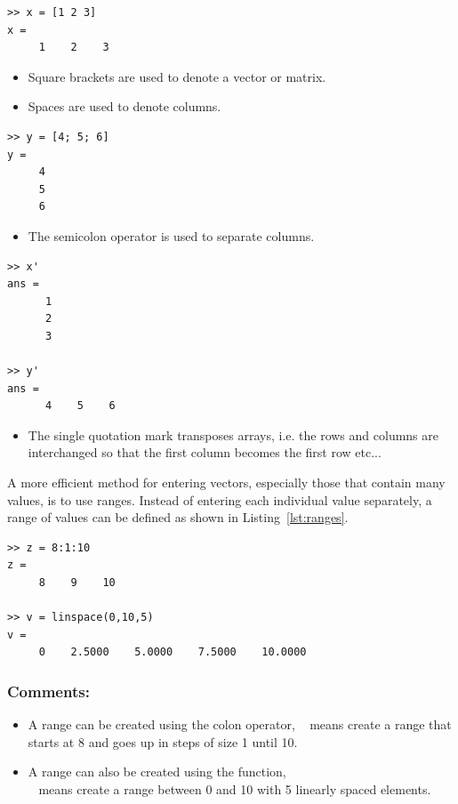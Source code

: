 \begin{lstlisting}[caption={Creating a row vector},label=lst:row_vect]
>> x = [1 2 3]
x = 
	 1    2    3
\end{lstlisting}
\begin{itemize}
\item Square brackets are used to denote a vector or matrix.
\item Spaces are used to denote columns.
\end{itemize}

\begin{lstlisting}[caption={Creating a column vector},label=lst:col_vect]	
>> y = [4; 5; 6]
y = 
	 4
	 5
	 6
\end{lstlisting}
\begin{itemize}
\item The semicolon operator is used to separate columns.
\end{itemize}

\begin{lstlisting}[caption={The transpose operator},label=lst:transpose]	
>> x'
ans = 
	  1
	  2
	  3
	 
>> y'
ans =
	  4    5    6
\end{lstlisting}
\begin{itemize}
\item The single quotation mark  transposes arrays, i.e. the rows and columns are interchanged so that the first column becomes the first row etc...
\end{itemize}

A more efficient method for entering vectors, especially those that contain many values, is to use ranges. Instead of entering each individual value separately, a range of values can be defined as shown in Listing~\ref{lst:ranges}.
\newpage
\begin{lstlisting}[caption={Creating vectors using ranges},label=lst:ranges]	
>> z = 8:1:10
z = 
	 8    9    10
	 
>> v = linspace(0,10,5)
v =
	 0    2.5000    5.0000    7.5000    10.0000
\end{lstlisting}

\subsubsection{Comments:}
\begin{itemize}
\item A range can be created using the colon operator, \eg\  means create a range that starts at 8 and goes up in steps of size 1 until 10.
\item A range can also be created using the  function, \\ \eg\  means create a range between 0 and 10 with 5 linearly spaced elements.
\end{itemize}

